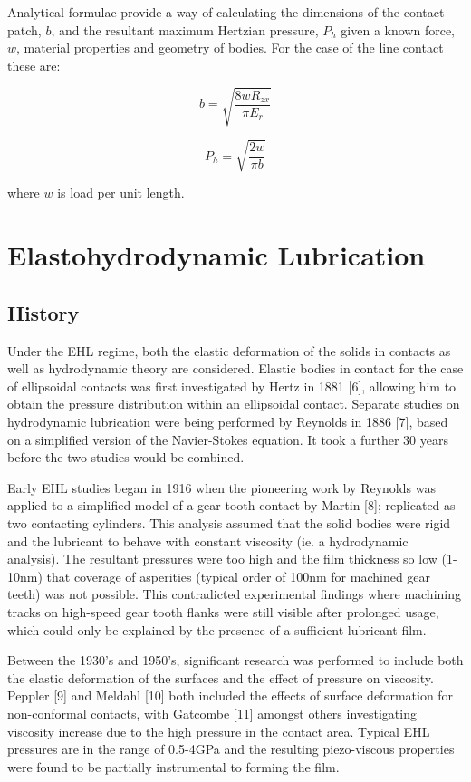 Analytical formulae provide a way of calculating the dimensions of the contact patch, $b$, and the resultant maximum Hertzian pressure, $P_h$ given a known force, $w$, material properties and geometry of bodies. For the case of the line contact these are:

\begin{equation}\label{eq2.3}
	b=\sqrt{\frac{8 w R_{z x}}{\pi E_r}}
\end{equation}

\begin{equation}\label{eq2.4}
	P_h=\sqrt{\frac{2 w}{\pi b}}
\end{equation}

where $w$ is load per unit length.

\section{Elastohydrodynamic Lubrication}

\subsection{History}

Under the EHL regime, both the elastic deformation of the solids in contacts as well as hydrodynamic theory are considered. Elastic bodies in contact for the case of ellipsoidal contacts was first investigated by Hertz in 1881 [6], allowing him to obtain the pressure distribution within an ellipsoidal contact. Separate studies on hydrodynamic lubrication were being performed by Reynolds in 1886 [7], based on a simplified version of the Navier-Stokes equation. It took a further 30 years before the two studies would be combined.

Early EHL studies began in 1916 when the pioneering work by Reynolds was applied to a simplified model of a gear-tooth contact by Martin [8]; replicated as two contacting cylinders. This analysis assumed that the solid bodies were rigid and the lubricant to behave with constant viscosity (ie. a hydrodynamic analysis). The resultant pressures were too high and the film thickness so low (1-10nm) that coverage of asperities (typical order of 100nm for machined gear teeth) was not possible. This contradicted experimental findings where machining tracks on high-speed gear tooth flanks were still visible after prolonged usage, which could only be explained by the presence of a sufficient lubricant film.

Between the 1930’s and 1950’s, significant research was performed to include both the elastic deformation of the surfaces and the effect of pressure on viscosity. Peppler [9] and Meldahl [10] both included the effects of surface deformation for non-conformal contacts, with Gatcombe [11] amongst others investigating viscosity increase due to the high pressure in the contact area. Typical EHL pressures are in the range of 0.5-4GPa and the resulting piezo-viscous properties were found to be partially instrumental to forming the film.

